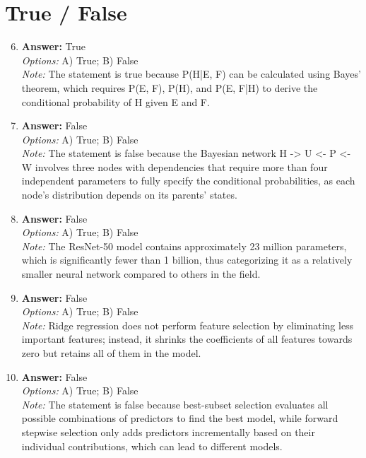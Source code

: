 \documentclass[12pt]{article}
\begin{document}
\section*{True / False}
\begin{enumerate}[label=\arabic*.]
\setcounter{enumi}{5}
\item \textbf{Answer:} True
\\ \textit{Options:} A) True; B) False
\\ \textit{Note:} The statement is true because P(H|E, F) can be calculated using Bayes' theorem, which requires P(E, F), P(H), and P(E, F|H) to derive the conditional probability of H given E and F.
\item \textbf{Answer:} False
\\ \textit{Options:} A) True; B) False
\\ \textit{Note:} The statement is false because the Bayesian network H -\textgreater{} U \textless{}- P \textless{}- W involves three nodes with dependencies that require more than four independent parameters to fully specify the conditional probabilities, as each node's distribution depends on its parents' states.
\item \textbf{Answer:} False
\\ \textit{Options:} A) True; B) False
\\ \textit{Note:} The ResNet-50 model contains approximately 23 million parameters, which is significantly fewer than 1 billion, thus categorizing it as a relatively smaller neural network compared to others in the field.
\item \textbf{Answer:} False
\\ \textit{Options:} A) True; B) False
\\ \textit{Note:} Ridge regression does not perform feature selection by eliminating less important features; instead, it shrinks the coefficients of all features towards zero but retains all of them in the model.
\item \textbf{Answer:} False
\\ \textit{Options:} A) True; B) False
\\ \textit{Note:} The statement is false because best-subset selection evaluates all possible combinations of predictors to find the best model, while forward stepwise selection only adds predictors incrementally based on their individual contributions, which can lead to different models.
\end{enumerate}
\end{document}

